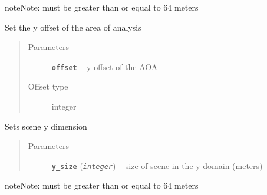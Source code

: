 \documentclass[letterpaper,10pt,english]{sphinxmanual}
\begin{document}
\begin{fulllineitems}
\begin{fulllineitems}
\begin{quote}
\begin{description}
\end{description}\end{quote}

\begin{notice}{note}{Note:}
 must be greater than or equal to 64 meters
\end{notice}

\end{fulllineitems}


\begin{fulllineitems}
\label{capsis_RunConfig:capsis.RunConfig.set_y_offset}
Set the y offset of the area of analysis
\begin{quote}\begin{description}
\item[{Parameters}] \leavevmode
\textbf{\texttt{offset}} -- y offset of the AOA

\item[{Offset type}] \leavevmode
integer

\end{description}\end{quote}

\end{fulllineitems}


\begin{fulllineitems}
\label{capsis_RunConfig:capsis.RunConfig.set_y_size}
Sets scene y dimension
\begin{quote}\begin{description}
\item[{Parameters}] \leavevmode
\textbf{\texttt{y\_size}} (\emph{\texttt{integer}}) -- size of scene in the y domain (meters)

\end{description}\end{quote}

\begin{notice}{note}{Note:}
 must be greater than or equal to 64 meters
\end{notice}

\end{fulllineitems}



\end{fulllineitems}
\end{document}
